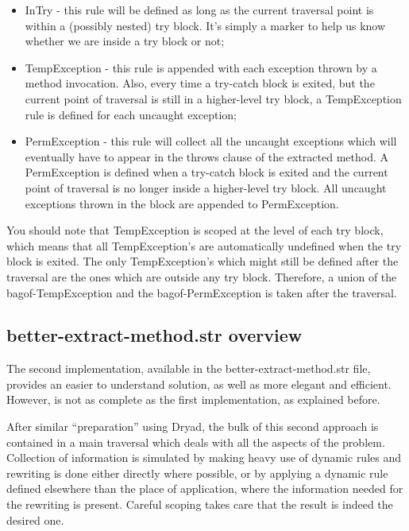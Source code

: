\documentclass[a4paper,10pt]{article}
\begin{document}
\begin{itemize}

\item \textsf{InTry} - this rule will be defined as long as the current
traversal point is within a (possibly nested) \textsf{try} block.
It's simply a marker to help us know whether we are inside a
\textsf{try} block or not;

\item \textsf{TempException} - this rule is appended with each exception
thrown by a method invocation. Also, every time a \textsf{try-catch}
block is exited, but the current point of traversal is still in a
higher-level \textsf{try} block, a \textsf{TempException} rule is
defined for each uncaught exception;

\item \textsf{PermException} - this rule will collect all the uncaught
exceptions which will eventually have to appear in the \textsf{throws}
clause of the extracted method. A \textsf{PermException} is defined
when a \textsf{try-catch} block is exited and the current point of traversal
is no longer inside a higher-level \textsf{try} block. All uncaught exceptions
thrown in the block are appended to \textsf{PermException}.

\end{itemize}

You should note that \textsf{TempException} is scoped at the level of
each \textsf{try} block, which means that all \textsf{TempException}'s
are automatically undefined when the \textsf{try} block is exited. The
only \textsf{TempException}'s which might still be defined after the
traversal are the ones which are outside any \textsf{try} block. Therefore,
a union of the \textsf{bagof-TempException} and the \textsf{bagof-PermException}
is taken after the traversal.

\subsection{\textsf{better-extract-method.str} overview}

The second implementation, available in the \textsf{better-extract-method.str}
file, provides an easier to understand solution, as well as more elegant
and efficient. However, is not as complete as the first implementation,
as explained before.

After similar ``preparation'' using Dryad, the bulk of this second
approach is contained in a main traversal which deals with all the
aspects of the problem. Collection of information is simulated by
making heavy use of dynamic rules and rewriting is done either
directly where possible, or by applying a dynamic rule defined
elsewhere than the place of application, where the information
needed for the rewriting is present. Careful scoping takes care
that the result is indeed the desired one.
\end{document}
